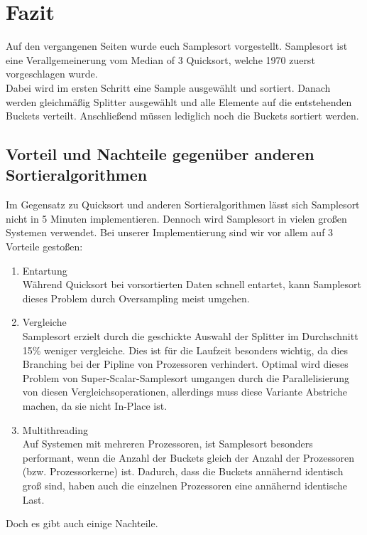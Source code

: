 \section{Fazit}
	Auf den vergangenen Seiten wurde euch Samplesort vorgestellt.
	Samplesort ist eine Verallgemeinerung vom Median of 3 Quicksort, welche 1970 zuerst vorgeschlagen wurde.\\
	Dabei wird im ersten Schritt eine Sample ausgewählt und sortiert.
	Danach werden gleichmäßig Splitter ausgewählt und alle Elemente auf die entstehenden Buckets verteilt.
	Anschließend müssen lediglich noch die Buckets sortiert werden.
	
	\subsection{Vorteil und Nachteile gegenüber anderen Sortieralgorithmen}
		Im Gegensatz zu Quicksort und anderen Sortieralgorithmen lässt sich Samplesort nicht in 5 Minuten implementieren.
		Dennoch wird Samplesort in vielen großen Systemen verwendet.
		Bei unserer Implementierung sind wir vor allem auf 3 Vorteile gestoßen:
		\begin{enumerate}
			\item Entartung\\
				Während Quicksort bei vorsortierten Daten schnell entartet, kann Samplesort dieses Problem durch Oversampling meist umgehen.
			\item Vergleiche\\
				Samplesort erzielt durch die geschickte Auswahl der Splitter im Durchschnitt 15\% weniger vergleiche.
				Dies ist für die Laufzeit besonders wichtig, da dies Branching bei der Pipline von Prozessoren verhindert.
				Optimal wird dieses Problem von Super-Scalar-Samplesort umgangen durch die Parallelisierung von diesen Vergleichsoperationen, allerdings muss diese Variante Abstriche machen, da sie nicht In-Place ist.
			\item Multithreading\\
				Auf Systemen mit mehreren Prozessoren, ist Samplesort besonders performant, wenn die Anzahl der Buckets gleich der Anzahl der Prozessoren (bzw. Prozessorkerne) ist.
				Dadurch, dass die Buckets annähernd identisch groß sind, haben auch die einzelnen Prozessoren eine annähernd identische Last.
		\end{enumerate}
		Doch es gibt auch einige Nachteile.
